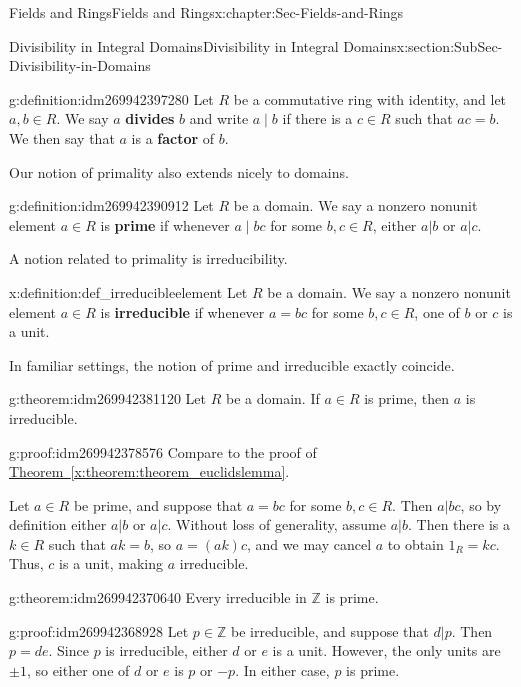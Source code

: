 \documentclass[oneside,10pt,]{book}
\newcommand{\terminology}[1]{\textbf{#1}}
\numberwithin{equation}{section}
\def\Z{{\mathbb Z}}
\begin{document}
\begin{chapterptx}{Fields and Rings}{}{Fields and Rings}{}{}{x:chapter:Sec-Fields-and-Rings}
\begin{sectionptx}{Divisibility in Integral Domains}{}{Divisibility in Integral Domains}{}{}{x:section:SubSec-Divisibility-in-Domains}
\begin{definition}{}{g:definition:idm269942397280}%
Let \(R\) be a commutative ring with identity, and let \(a,b\in R\). We say \(a\) \terminology{divides} \(b\) and write \(a\mid b\) if there is a \(c\in R\) such that \(ac = b\). We then say that \(a\) is a \terminology{factor} of \(b\).%
\end{definition}
Our notion of primality also extends nicely to domains.%
\begin{definition}{}{g:definition:idm269942390912}%
Let \(R\) be a domain. We say a nonzero nonunit element \(a\in R\) is \terminology{prime} if whenever \(a\mid bc\) for some \(b,c\in R\), either \(a|b\) or \(a|c\).%
\end{definition}
A notion related to primality is irreducibility.%
\begin{definition}{}{x:definition:def_irreducibleelement}%
Let \(R\) be a domain. We say a nonzero nonunit element \(a\in R\) is \terminology{irreducible} if whenever \(a = bc\) for some \(b,c\in R\), one of \(b\) or \(c\) is a unit.%
\end{definition}
In familiar settings, the notion of prime and irreducible exactly coincide.%
\begin{theorem}{}{}{g:theorem:idm269942381120}%
Let \(R\) be a domain. If \(a\in R\) is prime, then \(a\) is irreducible.%
\end{theorem}
\begin{proofptx}{}{g:proof:idm269942378576}
Compare to the proof of \hyperref[x:theorem:theorem_euclidslemma]{Theorem~\ref{x:theorem:theorem_euclidslemma}}.%
\par
Let \(a\in R\) be prime, and suppose that \(a = bc\) for some \(b,c\in R\). Then \(a|bc\), so by definition either \(a|b\) or \(a|c\). Without loss of generality, assume \(a|b\). Then there is a \(k\in R\) such that \(ak=b\), so \(a = (ak)c\), and we may cancel \(a\) to obtain \(1_R = kc\). Thus, \(c\) is a unit, making \(a\) irreducible.%
\end{proofptx}
\begin{theorem}{}{}{g:theorem:idm269942370640}%
Every irreducible in \(\Z\) is prime.%
\end{theorem}
\begin{proofptx}{}{g:proof:idm269942368928}
Let \(p\in \Z\) be irreducible, and suppose that \(d|p\). Then \(p = de\). Since \(p\) is irreducible, either \(d\) or \(e\) is a unit. However, the only units are \(\pm 1\), so either one of \(d\) or \(e\) is \(p\) or \(-p\). In either case, \(p\) is prime.%

\end{proofptx}
\end{sectionptx}
\end{chapterptx}
\end{document}
